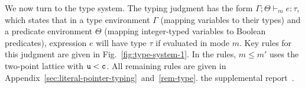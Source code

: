 We now turn to the \lang type system.
%
The typing judgment has the form $\Gamma;\Theta\vdash_m e : \tau$,
which states that in a type environment $\Gamma$ (mapping variables to
their types) and a predicate environment $\Theta$ (mapping integer-typed
variables to Boolean predicates), expression $e$ will have type $\tau$ if evaluated
in mode $m$. Key rules for this judgment are given in
Fig.~\ref{fig:type-system-1}. In the rules, $m \le m'$ uses
the two-point lattice with $\texttt{u} < \texttt{c}$.
All remaining rules
are given in
\iftr
Appendix~\ref{sec:literal-pointer-typing}~and~\ref{rem-type}.
\else
the supplemental report~\cite{checkedc-tech-report}.
\fi

